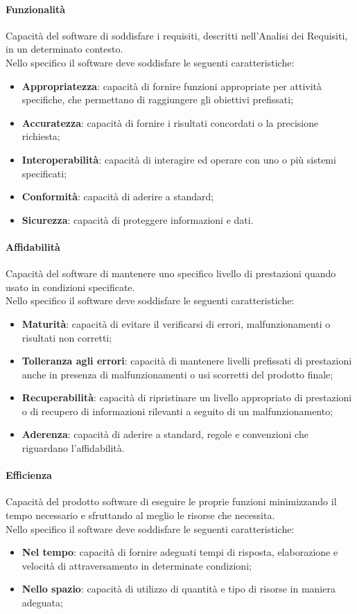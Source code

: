 		\paragraph{Funzionalità}
		Capacità del software di soddisfare i requisiti, descritti nell'Analisi dei Requisiti, in un determinato contesto.\\
		Nello specifico il software deve soddisfare le seguenti caratteristiche:
		\begin{itemize}
			\item \textbf{Appropriatezza}: capacità di fornire funzioni appropriate per attività specifiche, che permettano di raggiungere gli obiettivi prefissati;
			\item \textbf{Accuratezza}: capacità di fornire i risultati concordati o la precisione richiesta;
			\item \textbf{Interoperabilità}: capacità di interagire ed operare con uno o più sistemi specificati;
			\item \textbf{Conformità}: capacità di aderire a standard;
			\item \textbf{Sicurezza}: capacità di proteggere informazioni e dati.
		\end{itemize}
		\paragraph{Affidabilità}
		Capacità del software di mantenere uno specifico livello di prestazioni quando usato in condizioni specificate.\\
		Nello specifico il software deve soddisfare le seguenti caratteristiche:
		\begin{itemize}
			\item \textbf{Maturità}: capacità di evitare il verificarsi di errori, malfunzionamenti o risultati non corretti;
			\item \textbf{Tolleranza agli errori}: capacità di mantenere livelli prefissati di prestazioni anche in presenza di malfunzionamenti o usi scorretti del prodotto finale;
			\item \textbf{Recuperabilità}: capacità di ripristinare un livello appropriato di prestazioni o di recupero di informazioni rilevanti a seguito di un malfunzionamento;
			\item \textbf{Aderenza}:  capacità di aderire a standard, regole e convenzioni che riguardano l'affidabilità.
		\end{itemize}
		\paragraph{Efficienza}
		Capacità del prodotto software di eseguire le proprie funzioni minimizzando il tempo necessario e sfruttando al meglio le risorse che necessita.\\
		Nello specifico il software deve soddisfare le seguenti caratteristiche:
		\begin{itemize}
			\item \textbf{Nel tempo}: capacità di fornire adeguati tempi di risposta, elaborazione e velocità di attraversamento in determinate condizioni;
			\item \textbf{Nello spazio}: capacità di utilizzo di quantità e tipo di risorse in maniera adeguata;
		\end{itemize}
